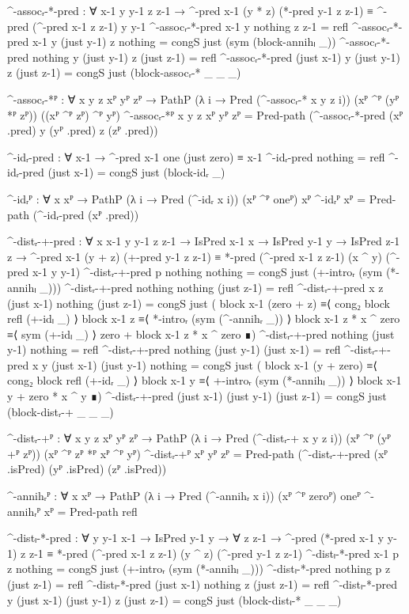 \begin{code}[hide]
  ^-assocᵣ-*-pred :
    ∀ x-1 y y-1 z z-1 →
    ^-pred x-1 (y * z) (*-pred y-1 z z-1) ≡ ^-pred (^-pred x-1 z z-1) y y-1
  ^-assocᵣ-*-pred x-1 y nothing z z-1 = refl
  ^-assocᵣ-*-pred x-1 y (just y-1) z nothing = congS just (sym (block-annihₗ _))
  ^-assocᵣ-*-pred nothing y (just y-1) z (just z-1) = refl
  ^-assocᵣ-*-pred (just x-1) y (just y-1) z (just z-1) =
    congS just (block-assocᵣ-* _ _ _)

  ^-assocᵣ-*ᴾ :
    ∀ {x y z} xᴾ yᴾ zᴾ →
    PathP (λ i → Pred (^-assocᵣ-* x y z i))
      (xᴾ ^ᴾ (yᴾ *ᴾ zᴾ)) ((xᴾ ^ᴾ zᴾ) ^ᴾ yᴾ)
  ^-assocᵣ-*ᴾ {x} {y} {z} xᴾ yᴾ zᴾ =
    Pred-path (^-assocᵣ-*-pred (xᴾ .pred) y (yᴾ .pred) z (zᴾ .pred))

  ^-idᵣ-pred : ∀ x-1 → ^-pred x-1 one (just zero) ≡ x-1
  ^-idᵣ-pred nothing = refl
  ^-idᵣ-pred (just x-1) = congS just (block-idᵣ _)

  ^-idᵣᴾ : ∀ {x} xᴾ → PathP (λ i → Pred (^-idᵣ x i)) (xᴾ ^ᴾ oneᴾ) xᴾ
  ^-idᵣᴾ xᴾ = Pred-path (^-idᵣ-pred (xᴾ .pred))

  ^-distᵣ-+-pred :
    ∀ {x x-1 y y-1 z z-1} → IsPred x-1 x → IsPred y-1 y → IsPred z-1 z →
    ^-pred x-1 (y + z) (+-pred y-1 z z-1) ≡
    *-pred (^-pred x-1 z z-1) (x ^ y) (^-pred x-1 y y-1)
  ^-distᵣ-+-pred p nothing nothing =
    congS just (+-introᵣ (sym (*-annihₗ _)))
  ^-distᵣ-+-pred nothing nothing (just z-1) = refl
  ^-distᵣ-+-pred {x} {z} (just x-1) nothing (just z-1) =
    congS just
      ( block x-1 (zero + z)          ≡⟨ cong₂ block refl (+-idₗ _) ⟩
        block x-1 z                   ≡⟨ *-introᵣ (sym (^-annihᵣ _)) ⟩
        block x-1 z * x ^ zero        ≡⟨ sym (+-idₗ _) ⟩
        zero + block x-1 z * x ^ zero ∎)
  ^-distᵣ-+-pred nothing (just y-1) nothing = refl
  ^-distᵣ-+-pred nothing (just y-1) (just x-1) = refl
  ^-distᵣ-+-pred {x} {y} (just x-1) (just y-1) nothing =
    congS just
      ( block x-1 (y + zero)       ≡⟨ cong₂ block refl (+-idᵣ _) ⟩
        block x-1 y                ≡⟨ +-introᵣ (sym (*-annihₗ _)) ⟩
        block x-1 y + zero * x ^ y ∎)
  ^-distᵣ-+-pred (just x-1) (just y-1) (just z-1) =
    congS just (block-distᵣ-+ _ _ _)

  ^-distᵣ-+ᴾ :
    ∀ {x y z} xᴾ yᴾ zᴾ →
    PathP (λ i → Pred (^-distᵣ-+ x y z i))
      (xᴾ ^ᴾ (yᴾ +ᴾ zᴾ)) (xᴾ ^ᴾ zᴾ *ᴾ xᴾ ^ᴾ yᴾ)
  ^-distᵣ-+ᴾ xᴾ yᴾ zᴾ =
    Pred-path (^-distᵣ-+-pred (xᴾ .isPred) (yᴾ .isPred) (zᴾ .isPred))

  ^-annihᵣᴾ : ∀ {x} xᴾ → PathP (λ i → Pred (^-annihᵣ x i)) (xᴾ ^ᴾ zeroᴾ) oneᴾ
  ^-annihᵣᴾ xᴾ = Pred-path refl

  ^-distₗ-*-pred :
    ∀ {y y-1} x-1 → IsPred y-1 y → ∀ z z-1 →
    ^-pred (*-pred x-1 y y-1) z z-1 ≡
    *-pred (^-pred x-1 z z-1) (y ^ z) (^-pred y-1 z z-1)
  ^-distₗ-*-pred x-1 p z nothing = congS just (+-introᵣ (sym (*-annihₗ _)))
  ^-distₗ-*-pred nothing p z (just z-1) = refl
  ^-distₗ-*-pred (just x-1) nothing z (just z-1) = refl
  ^-distₗ-*-pred {y} (just x-1) (just y-1) z (just z-1) =
    congS just (block-distₗ-* _ _ _)


\end{code}
